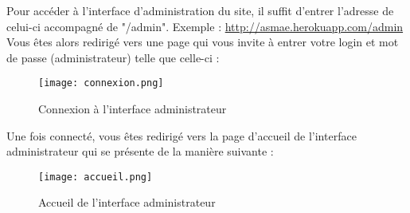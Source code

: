 Pour accéder à l’interface d’administration du site, il suffit d’entrer l’adresse de celui-ci accompagné de "/admin". Exemple : \href{http://asmae.herokuapp.com/admin}{http://asmae.herokuapp.com/admin}\\
Vous êtes alors redirigé vers une page qui vous invite à entrer votre login et mot de passe (administrateur) telle que celle-ci :

\begin{figure}[H]
\centering
\texttt{[image: connexion.png]}
\caption{Connexion à l'interface administrateur}
\end{figure}

Une fois connecté, vous êtes redirigé vers la page d'accueil de l'interface administrateur qui se présente de la manière suivante :

\begin{figure}[H]
\centering
\texttt{[image: accueil.png]}
\caption{Accueil de l'interface administrateur}
\end{figure}


